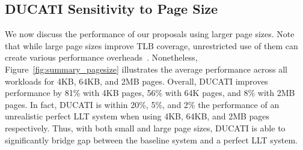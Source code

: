 \subsection{DUCATI Sensitivity to Page Size}

\noindent We now discuss the performance of our proposals using larger
page sizes. Note that while large page sizes improve TLB coverage,
unrestricted use of them can create various performance
overheads~\cite{SuperPageProblem,TwoPageSize,numa-harmful,cameo,largepagevm}.
Nonetheless, Figure~\ref{fig:summary_pagesize} illustrates the average
performance across all workloads for 4KB, 64KB, and 2MB pages.
Overall, DUCATI improves performance by 81\% with 4KB pages, 56\% with
64K pages, and 8\% with 2MB pages. In fact, DUCATI is within 20\%,
5\%, and 2\% the performance of an unrealistic perfect LLT system when
using 4KB, 64KB, and 2MB pages respectively. Thus, with both small and
large page sizes, DUCATI is able to significantly bridge gap between
the baseline system and a perfect LLT system.



% 
% 
